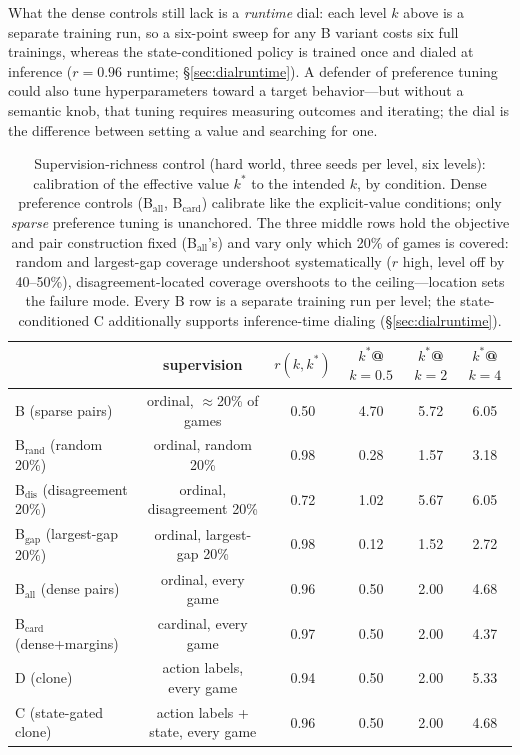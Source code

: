 \documentclass[manuscript, screen, review]{jair}
\begin{document}
What the dense controls still lack is a \emph{runtime} dial: each level $k$ above is a separate
training run, so a six-point sweep for any B variant costs six full trainings, whereas the
state-conditioned policy is trained once and dialed at inference ($r{=}0.96$ runtime;
\S\ref{sec:dialruntime}). A defender of preference tuning could also tune hyperparameters
toward a target behavior---but without a semantic knob, that tuning requires measuring outcomes
and iterating; the dial is the difference between setting a value and searching for one.

\begin{table}[t]
\centering
\caption{Supervision-richness control (hard world, three seeds per level, six levels):
calibration of the effective value $k^*$ to the intended $k$, by condition. Dense preference
controls (B$_{\mathrm{all}}$, B$_{\mathrm{card}}$) calibrate like the explicit-value
conditions; only \emph{sparse} preference tuning is unanchored. The three middle rows hold the
objective and pair construction fixed (B$_{\mathrm{all}}$'s) and vary only which 20\% of games
is covered: random and largest-gap coverage undershoot systematically ($r$ high, level off by
40--50\%), disagreement-located coverage overshoots to the ceiling---location sets the failure
mode. Every B row is a separate training run per level; the state-conditioned C additionally
supports inference-time dialing (\S\ref{sec:dialruntime}).}
\label{tab:dialrich}
\small
\setlength{\tabcolsep}{5pt}
\begin{tabular}{l c c c c c}
\toprule
 & supervision & $r(k, k^*)$ & $k^*$@$k{=}0.5$ & $k^*$@$k{=}2$ & $k^*$@$k{=}4$ \\
\midrule
B (sparse pairs) & ordinal, $\approx$20\% of games & 0.50 & 4.70 & 5.72 & 6.05 \\
\midrule
B$_{\mathrm{rand}}$ (random 20\%) & ordinal, random 20\% & 0.98 & 0.28 & 1.57 & 3.18 \\
B$_{\mathrm{dis}}$ (disagreement 20\%) & ordinal, disagreement 20\% & 0.72 & 1.02 & 5.67 & 6.05 \\
B$_{\mathrm{gap}}$ (largest-gap 20\%) & ordinal, largest-gap 20\% & 0.98 & 0.12 & 1.52 & 2.72 \\
\midrule
B$_{\mathrm{all}}$ (dense pairs) & ordinal, every game & 0.96 & 0.50 & 2.00 & 4.68 \\
B$_{\mathrm{card}}$ (dense+margins) & cardinal, every game & 0.97 & 0.50 & 2.00 & 4.37 \\
D (clone) & action labels, every game & 0.94 & 0.50 & 2.00 & 5.33 \\
C (state-gated clone) & action labels + state, every game & 0.96 & 0.50 & 2.00 & 4.68 \\
\bottomrule
\end{tabular}
\end{table}
\end{document}
